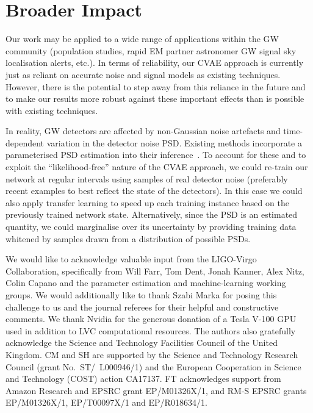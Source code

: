 \documentclass{article}
\begin{document}
%
%

\section*{Broader Impact}



%
%
Our work may be applied to a wide range of applications within the 
\ac{GW} community (population studies, rapid \ac{EM} partner 
astronomer \ac{GW} signal sky localisation alerts, etc.). In terms of  
reliability, our \ac{CVAE} approach is currently just as 
reliant on accurate noise and signal models as existing techniques. 
However, there is the potential to step away from this reliance in the 
future and to make our results more robust against these important 
effects than is possible with existing techniques.

In reality, \ac{GW} detectors are affected by non-Gaussian noise artefacts and
time-dependent variation in the detector noise \ac{PSD}. Existing methods
incorporate a parameterised \ac{PSD} estimation into their
inference~\cite{2015PhRvD..91h4034L}. To account for these and to exploit the
``likelihood-free'' nature of the \ac{CVAE} approach, we could re-train our
network at regular intervals using samples of real detector noise (preferably
recent examples to best reflect the state of the detectors). In this case
we could also apply transfer learning to speed up each training instance based
on the previously trained network state.  Alternatively, since the \ac{PSD} is
an estimated quantity, we could marginalise over its uncertainty by providing
training data whitened by samples drawn from a distribution of possible
\acp{PSD}.

\begin{ack}
%
%
%
We would like to acknowledge valuable input from the LIGO-Virgo Collaboration,
specifically from Will Farr, Tom Dent, Jonah Kanner, Alex Nitz, Colin Capano 
and the parameter estimation 
and machine-learning working groups. We would additionally like to thank Szabi 
Marka for posing this challenge to us and the journal referees for their 
helpful and constructive comments. We thank Nvidia for the generous donation 
of a Tesla V-100 GPU used in addition to \ac{LVC} computational resources. 
The authors also gratefully acknowledge the Science and Technology Facilities 
Council of the United Kingdom. CM and SH are supported by the Science and 
Technology Research Council (grant No.~ST/~L000946/1) and the European 
Cooperation in Science and Technology (COST) action CA17137. FT acknowledges 
support from Amazon Research and  EPSRC grant EP/M01326X/1, and RM-S EPSRC 
grants EP/M01326X/1, EP/T00097X/1 and EP/R018634/1. 
\end{ack}

%

\end{document}
